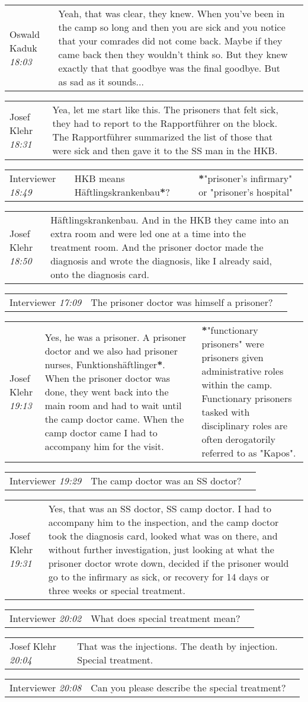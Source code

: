 \documentclass{article}
\newcommand{\I}{Interviewer}
\newcommand{\OK}{Oswald Kaduk}
\newcommand{\JK}{Josef Klehr}
\newcommand{\dialogueentry}[4]{
    \begin{center}
    \begin{tabular}{p{1in} p{3.5in} p{1.5in}} 
        #2 \newline \textit{#1} & #3 & \small{#4} 
    \end{tabular}
    \end{center}
}
\newcommand{\seenote}[1]{\textbf{#1}}
\begin{document}
\dialogueentry{18:03}{\OK}{Yeah, that was clear, they knew. When you've been in the camp so long and then you are sick and you notice that your comrades did not come back. Maybe if they came back then they wouldn't think so. But they knew exactly that that goodbye was the final goodbye. But as sad as it sounds...}{}

\dialogueentry{18:31}{\JK}{Yea, let me start like this. The prisoners that felt sick, they had to report to the Rapportführer on the block. The Rapportführer summarized the list of those that were sick and then gave it to the SS man in the HKB.}{}

\dialogueentry{18:49}{\I}{HKB means Häftlingskrankenbau\seenote{*}?}{\seenote{*}"prisoner's infirmary" or "prisoner's hospital"} 

\dialogueentry{18:50}{\JK}{Häftlingskrankenbau. And in the HKB they came into an extra room and were led one at a time into the treatment room. And the prisoner doctor made the diagnosis and wrote the diagnosis, like I already said, onto the diagnosis card.}{}

\dialogueentry{17:09}{\I}{The prisoner doctor was himself a prisoner?}{}

\dialogueentry{19:13}{\JK}{Yes, he was a prisoner. A prisoner doctor and we also had prisoner nurses, Funktionshäftlinger\seenote{*}. When the prisoner doctor was done, they went back into the main room and had to wait until the camp doctor came. When the camp doctor came I had to accompany him for the visit.}{\seenote{*}"functionary prisoners" were prisoners given administrative roles within the camp. Functionary prisoners tasked with disciplinary roles are often derogatorily referred to as "Kapos".}

\dialogueentry{19:29}{\I}{The camp doctor was an SS doctor?}{}

\dialogueentry{19:31}{\JK}{Yes, that was an SS doctor, SS camp doctor. I had to accompany him to the inspection, and the camp doctor took the diagnosis card, looked what was on there, and without further investigation, just looking at what the prisoner doctor wrote down, decided if the prisoner would go to the infirmary as sick, or recovery for 14 days or three weeks or special treatment.}{}

\dialogueentry{20:02}{\I}{What does special treatment mean?}{}

\dialogueentry{20:04}{\JK}{That was the injections. The death by injection. Special treatment.}{}

\dialogueentry{20:08}{\I}{Can you please describe the special treatment?}{}
\end{document}
